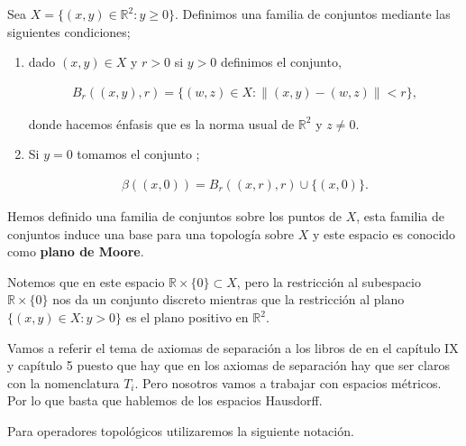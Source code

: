 \begin{ej}
Sea $X= \{(x,y) \in \mathbb{R}^2: y \geq 0 \}$. Definimos una familia de conjuntos mediante las siguientes condiciones; 

\begin{enumerate}
	\item dado $(x,y) \in X$ y $r>0$ si $y > 0$ definimos el conjunto,

	\begin{align*}
	B_r((x,y),r)=\{(w,z) \in X : \| (x,y)-(w,z) \| < r \},	
	\end{align*}

donde hacemos énfasis que es la norma usual de $\mathbb{R}^2$ y $z \neq 0$. 

	\item Si $y=0$ tomamos el conjunto ;

	\begin{align*}
	\beta((x,0))=B_r((x,r),r) \cup \{(x,0)\}.
	\end{align*}
\end{enumerate}

Hemos definido una familia de conjuntos sobre los puntos de $X$, esta familia de conjuntos induce una base para una topología sobre $X$ y este espacio es conocido como \textbf{plano de Moore}.

Notemos que en este espacio $\mathbb{R} \times \{0\} \subset X$, pero la restricción al subespacio $\mathbb{R} \times \{0\}$ nos da un conjunto discreto mientras que la restricción al plano $\{(x,y)\in X :y > 0 \}$ es el plano positivo en $\mathbb{R}^2.$
\end{ej}

Vamos a referir el tema de axiomas de separación a los libros de \cite{top_prieto} en el capítulo IX y \cite{top_willd} capítulo 5 puesto que hay que en los axiomas de separación hay que ser claros con la nomenclatura $T_i$. Pero nosotros vamos a trabajar con espacios métricos. Por lo que basta que hablemos de los espacios Hausdorff. 





Para operadores topológicos utilizaremos la siguiente notación. 

